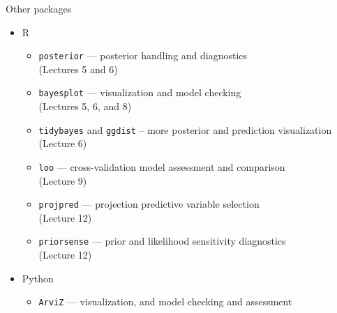 \documentclass[finnish,english,t]{beamer}
\begin{document}
\begin{frame}{Other packages}

  \begin{itemize}
  \item R
    \begin{itemize}
    \item \texttt{posterior} --- posterior handling and diagnostics\\ (Lectures 5 and 6)
    \item \texttt{bayesplot} --- visualization and model checking\\ (Lectures 5, 6, and 8)
    \item \texttt{tidybayes} and \texttt{ggdist} -- more posterior and prediction visualization (Lecture 6)
    \item \texttt{loo} --- cross-validation model assessment and comparison\\ (Lecture 9)
    \item \texttt{projpred} --- projection predictive variable selection\\ (Lecture 12)
    \item \texttt{priorsense} --- prior and likelihood sensitivity
      diagnostics\\ (Lecture 12)
    \end{itemize}
    \vspace{\baselineskip}
  \item Python
    \begin{itemize}
    \item \texttt{ArviZ} --- visualization, and model checking and assessment
    \end{itemize}
  \end{itemize}

\end{frame} 
\end{document}

